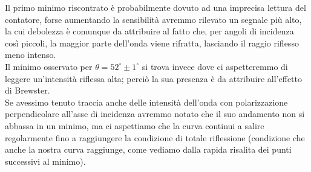 \documentclass{article}
\theoremstyle{definition}
\begin{document}
\begin{figure}[!htbp]
    	\captionsetup{labelformat=empty}

\end{figure}

\pagebreak

\begin{figure}[!ht]
    	\captionsetup{labelformat=empty}

\end{figure}
Il primo minimo riscontrato è probabilmente dovuto ad una imprecisa lettura del contatore, forse aumentando la sensibilità avremmo rilevato un segnale più alto, la cui debolezza è comunque da attribuire al fatto che, per angoli di incidenza così piccoli, la maggior parte dell'onda viene rifratta, lasciando il raggio riflesso meno intenso.\\
Il minimo osservato per \(\theta = 52^{\circ} \pm 1^{\circ}\) si trova invece dove ci aspetteremmo di leggere un'intensità riflessa alta; perciò la sua presenza è da attribuire all'effetto di Brewster.\\

\noindent Se avessimo tenuto traccia anche delle intensità dell'onda con polarizzazione perpendicolare all'asse di incidenza avremmo notato che il suo andamento non si abbassa in un minimo, ma ci aspettiamo che la curva continui a salire regolarmente fino a raggiungere la condizione di totale riflessione (condizione che anche la nostra curva raggiunge, come vediamo dalla rapida risalita dei punti successivi al minimo).\\
\end{document}
